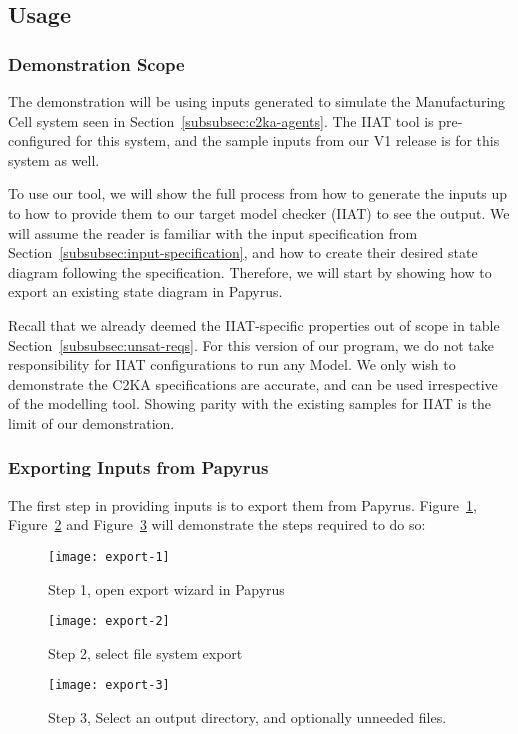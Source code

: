 \subsection{Usage}\label{subsec:usage}
\subsubsection{Demonstration Scope}\label{subsubsec:scope}
The demonstration will be using inputs generated to simulate the Manufacturing Cell system seen in Section~\ref{subsubsec:c2ka-agents}.
The IIAT tool is pre-configured for this system, and the sample inputs from our V1 release is for this system as well.

To use our tool, we will show the full process from how to generate the inputs up to how to provide them to our target model checker (IIAT) to see the output.
We will assume the reader is familiar with the input specification from Section~\ref{subsubsec:input-specification},
and how to create their desired state diagram following the specification.
Therefore, we will start by showing how to export an existing state diagram in Papyrus.

Recall that we already deemed the IIAT-specific properties out of scope in table Section~\ref{subsubsec:unsat-reqs}.
For this version of our program, we do not take responsibility for IIAT configurations to run any Model.
We only wish to demonstrate the C2KA specifications are accurate, and can be used irrespective of the modelling tool.
Showing parity with the existing samples for IIAT is the limit of our demonstration.


\subsubsection{Exporting Inputs from Papyrus}
The first step in providing inputs is to export them from Papyrus.
Figure~\ref{fig:export-1}, Figure~\ref{fig:export-2} and Figure~\ref{fig:export-3} will demonstrate the steps required to do so:
\begin{figure}[ht]
    \centering
    \texttt{[image: export-1]}
    \caption{Step 1, open export wizard in Papyrus}
    \label{fig:export-1}
\end{figure}
\begin{figure}[ht]
    \centering
    \texttt{[image: export-2]}
    \caption{Step 2, select file system export}
    \label{fig:export-2}
\end{figure}
\begin{figure}[ht]
    \centering
    \texttt{[image: export-3]}
    \caption{Step 3, Select an output directory, and optionally unneeded files.}
    \label{fig:export-3}
\end{figure}

